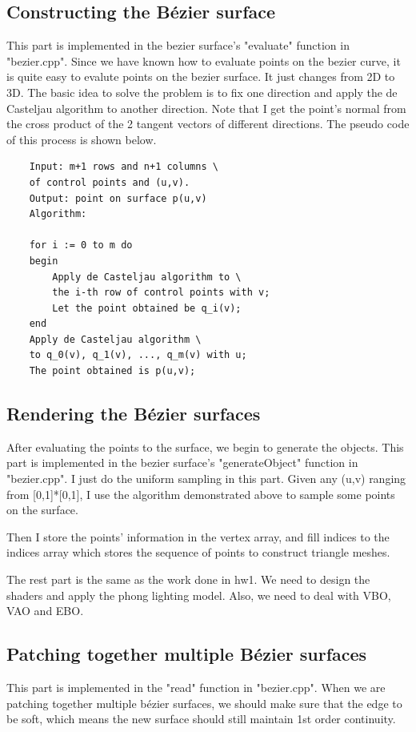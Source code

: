 \documentclass[acmtog]{acmart}
\begin{document}
\subsection{Constructing the Bézier surface}
\quad This part is implemented in the bezier surface's "evaluate" function in "bezier.cpp". Since we have known how to evaluate points on the bezier curve, it is quite easy to evalute points on the bezier surface. 
It just changes from 2D to 3D. The basic idea to solve the problem is to fix one direction and apply the de Casteljau algorithm to another direction.
Note that I get the point's normal from the cross product of the 2 tangent vectors of different directions. The pseudo code of this process is shown below.
\begin{lstlisting}
	Input: m+1 rows and n+1 columns \
	of control points and (u,v).
	Output: point on surface p(u,v)
	Algorithm:

	for i := 0 to m do
	begin
		Apply de Casteljau algorithm to \
		the i-th row of control points with v;
		Let the point obtained be q_i(v);
	end
	Apply de Casteljau algorithm \
	to q_0(v), q_1(v), ..., q_m(v) with u;
	The point obtained is p(u,v);
\end{lstlisting}

\subsection{Rendering the Bézier surfaces}
\quad 
After evaluating the points to the surface, we begin to generate the objects. 
This part is implemented in the bezier surface's "generateObject" function in "bezier.cpp". 
I just do the uniform sampling in this part. 
Given any (u,v) ranging from [0,1]*[0,1], 
I use the algorithm demonstrated above to sample some points on the surface.

Then I store the points' information in the vertex array, and fill indices to the indices array which stores the sequence of points to construct triangle meshes.

The rest part is the same as the work done in hw1. We need to design the shaders and apply the phong lighting model. Also, we need to deal with VBO, VAO and EBO. 

\subsection{Patching together multiple Bézier surfaces}
\quad This part is implemented in the "read" function in "bezier.cpp". 
When we are patching together multiple bézier surfaces, we should make sure that the edge to be soft, which means the new surface should still maintain 1st order continuity. 
\end{document}
